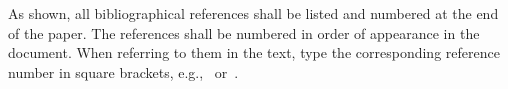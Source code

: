\documentclass{article}
\begin{document}



\noindent As shown, all bibliographical references shall be listed and numbered at the end of the paper. The references shall be numbered in order of appearance in the document.  When referring to them in the text, type the corresponding reference number in square brackets, e.g.,~\cite{C1} or~\cite{C1,C2}.

\end{document}
